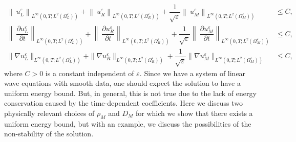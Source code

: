 \documentclass[11pt]{article}
\def\es{\varepsilon}
\def\orr{\Omega_R^\varepsilon}
\def\omm{\Omega_M^\varepsilon}
\def\oll{\Omega_L^\varepsilon}
\begin{document}
 \begin{subequations}
	\begin{align}
     \left\|\ u_L^\es\right\|_{L^{\infty}(0,T;L^2(\oll))}+  \left\|\ u_R^\es\right\|_{L^{\infty}(0,T;L^2(\orr))}+  \dfrac{1}{\sqrt{\es}}\left\|\ u_M^\es\right\|_{L^{\infty}(0,T;L^2(\omm))}&\leq C,\label{eq:energy_estimate_1_case_1}\\
	    \left\|\ \dfrac{\partial u_L^\es}{\partial t}\right\|_{L^{\infty}(0,T;L^2(\oll))}+  \left\|\ \dfrac{\partial u_R^\es}{\partial t}\right\|_{L^{\infty}(0,T;L^2(\orr))}+  \dfrac{1}{\sqrt{\es}}\left\|\ \dfrac{\partial u_M^\es}{\partial t}\right\|_{L^{\infty}(0,T;L^2(\omm))}&\leq C,\label{eq:energy_estimate_2_case_1}\\
	    \|\nabla u_L^\es\|_{L^{\infty}(0,T;L^2(\oll))}+\|\nabla u_R^\es\|_{L^{\infty}(0,T;L^2(\orr))}+\dfrac{1}{\sqrt{\es}}\|\nabla u_M^\es\|_{L^{\infty}(0,T;L^2(\omm))}&\leq C\label{eq:energy_estimate_3_case_1},
	\end{align}
\end{subequations}
 where $C>0$ is a constant independent of $\es$.
 Since we have a system of linear wave equations with smooth data, one should expect the solution to have a uniform energy bound. But, in general, this is not true due to the lack of energy conservation caused by the time-dependent coefficients. Here we discuss two physically relevant choices of $\rho_M$ and $D_M$ for which  we show that there exists a uniform energy bound, but with an example, we discuss the possibilities of the non-stability of the solution.
\end{document}
